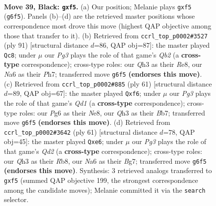 \documentclass[11pt]{article}
\begin{document}
\clearpage

\begin{figure}[p]\centering
\begin{subfigure}{0.46\textwidth}\centering
\resizebox{\linewidth}{!}{%
\newchessgame
\chessboard[
  setfen={r5k1/pp6/n2Q2p1/2pP1B2/6p1/P4PPq/1P6/2RR2K1 b - - 0 39},
  showmover=false,
  pgfstyle=straightmove, color=movearrow, markmove={g6-f5}
]}
\caption{}
\end{subfigure}\hfill
\begin{subfigure}{0.46\textwidth}\centering
\resizebox{\linewidth}{!}{%
\newchessgame
\chessboard[
  setfen={4r1k1/1q3pPp/8/b1pQ2PP/p2pP3/3R1K2/8/3R4 b - - 4 46},
  showmover=false,
  pgfstyle=straightmove, color=movearrow, markmove={b7-c8}
]}
\caption{}
\end{subfigure}
\\[4pt]
\begin{subfigure}{0.46\textwidth}\centering
\resizebox{\linewidth}{!}{%
\newchessgame
\chessboard[
  setfen={r2qn2k/1b3Qp1/4pB1p/pp5P/8/PP1P2R1/5PP1/1K4R1 b - - 0 31},
  showmover=false,
  pgfstyle=straightmove, color=movearrow, markmove={d8-f6}
]}
\caption{}
\end{subfigure}\hfill
\begin{subfigure}{0.46\textwidth}\centering
\resizebox{\linewidth}{!}{%
\newchessgame
\chessboard[
  setfen={1r4k1/3q1pb1/p2pB3/2p4Q/P7/1p5P/1P4P1/3R1RK1 b - - 0 31},
  showmover=false,
  pgfstyle=straightmove, color=movearrow, markmove={d7-e6}
]}
\caption{}
\end{subfigure}
\caption{\textbf{Move 39, Black: \texttt{gxf5}.} (a) Our position; Melanie plays \texttt{gxf5} (\texttt{g6f5}). Panels (b)--(d) are the retrieved master positions whose correspondence most drove this move (highest QAP objective among those that transfer to it). (b) Retrieved from \texttt{ccrl\_top\_p0002\#3527} (ply 91) [structural distance $d$=86, QAP obj=87]: the master played \texttt{Qc8}; under $\mu$ our \emph{Pg3} plays the role of that game's \emph{Qb2} (a \textbf{cross-type} correspondence); cross-type roles: our \emph{Q}h3 as their \emph{R}e8, our \emph{N}a6 as their \emph{P}h7; transferred move \texttt{g6f5} \textbf{(endorses this move)}. (c) Retrieved from \texttt{ccrl\_top\_p0002\#885} (ply 61) [structural distance $d$=89, QAP obj=67]: the master played \texttt{Qxf6}; under $\mu$ our \emph{Pg3} plays the role of that game's \emph{Qd1} (a \textbf{cross-type} correspondence); cross-type roles: our \emph{P}g6 as their \emph{N}e8, our \emph{Q}h3 as their \emph{B}b7; transferred move \texttt{g6f5} \textbf{(endorses this move)}. (d) Retrieved from \texttt{ccrl\_top\_p0002\#3642} (ply 61) [structural distance $d$=78, QAP obj=45]: the master played \texttt{Qxe6}; under $\mu$ our \emph{Pg3} plays the role of that game's \emph{Qd2} (a \textbf{cross-type} correspondence); cross-type roles: our \emph{Q}h3 as their \emph{R}b8, our \emph{N}a6 as their \emph{B}g7; transferred move \texttt{g6f5} \textbf{(endorses this move)}. Synthesis: 3 retrieved analogs transferred to \texttt{gxf5} (summed QAP objective 199, the strongest correspondence among the candidate moves); Melanie committed it via the \texttt{search} selector.}
\label{fig:thought-m77}
\end{figure}
\end{document}
